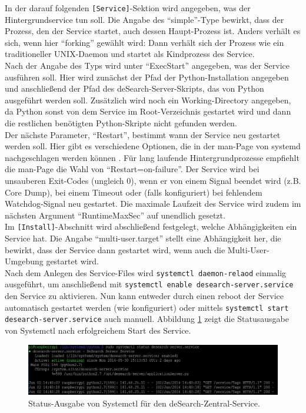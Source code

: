 In der darauf folgenden \texttt{[Service]}-Sektion wird angegeben, was der Hintergrundservice tun soll. Die Angabe des \enquote{simple}-Type bewirkt, dass der Prozess, den der Service startet, auch dessen Haupt-Prozess ist. Anders verhält es sich, wenn hier \enquote{forking} gewählt wird: Dann verhält sich der Prozess wie ein traditioneller UNIX-Daemon und startet als Kindprozess des Service. \\
Nach der Angabe des Typs wird unter \enquote{ExecStart} angegeben, was der Service ausführen soll. Hier wird zunächst der Pfad der Python-Installation angegeben und anschließend der Pfad des deSearch-Server-Skripts, das von Python ausgeführt werden soll. Zusätzlich wird noch ein Working-Directory angegeben, da Python sonst von dem Service im Root-Verzeichnis gestartet wird und dann die restlichen benötigten Python-Skripte nicht gefunden werden. \\
Der nächste Parameter, \enquote{Restart}, bestimmt wann der Service neu gestartet werden soll. Hier gibt es verschiedene Optionen, die in der man-Page von systemd nachgeschlagen werden können \citep{systemd-service}. Für lang laufende Hintergrundprozesse empfiehlt die man-Page die Wahl von \enquote{Restart=on-failure}. Der Service wird bei unsauberen Exit-Codes (ungleich 0), wenn er von einem Signal beendet wird (z.B. Core Dump), bei einem Timeout oder (falls konfiguriert) bei fehlendem Watchdog-Signal neu gestartet. Die maximale Laufzeit des Service wird zudem im nächsten Argument \enquote{RuntimeMaxSec} auf unendlich gesetzt.\\
Im \texttt{[Install]}-Abschnitt wird abschließend festgelegt, welche Abhängigkeiten ein Service hat. Die Angabe \enquote{multi-user.target} stellt eine Abhängigkeit her, die bewirkt, dass der Service dann gestartet wird, wenn auch die Multi-User-Umgebung gestartet wird. \\
Nach dem Anlegen des Service-Files wird \texttt{systemctl daemon-relaod} einmalig ausgeführt, um anschließend mit \texttt{systemctl enable desearch-server.service} den Service zu aktivieren. Nun kann entweder durch einen reboot der Service automatisch gestartet werden (wie konfiguriert) oder mittels \texttt{systemctl start desearch-server.service} auch manuell. Abbildung \ref{fig:systemctl-status} zeigt die Statusausgabe von Systemctl nach erfolgreichem Start des Service.
\begin{figure}[bth]
	\centering
	\includegraphics[width=1.0\linewidth]{images/service-status}
	\caption[Status-Ausgabe von Systemctl]{Status-Ausgabe von Systemctl für den deSearch-Zentral-Service.}
	\label{fig:systemctl-status}
\end{figure}

